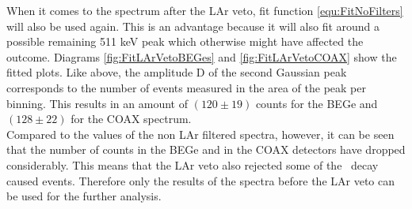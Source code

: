 \documentclass[encoding=utf8,british]{tumphthesis}
\begin{document}
When it comes to the spectrum after the LAr veto, fit function \ref{equ:FitNoFilters} will also be used again.
This is an advantage because it will also fit around a possible remaining 511 keV peak which otherwise might have affected the outcome.
Diagrams \ref{fig:FitLArVetoBEGes} and \ref{fig:FitLArVetoCOAX} show the fitted plots.
Like above, the amplitude D of the second Gaussian peak corresponds to the number of events measured in the area of the peak per binning.
This results in an amount of $(120\pm19)$ counts for the BEGe and $(128\pm22)$ for the COAX spectrum.
\\

Compared to the values of the non LAr filtered spectra, however, it can be seen that the number of counts in the BEGe and in the COAX detectors have dropped considerably.
This means that the LAr veto also rejected some of the \Kr\ decay caused events.
Therefore only the results of the spectra before the LAr veto can be used for the further analysis.
\\
\end{document}
